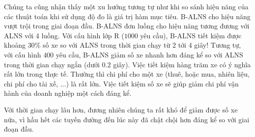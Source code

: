 Chúng ta cũng nhận thấy một xu hướng tương tự như khi so sánh hiệu năng của các thuật toán khi sử dụng độ đo là giá trị hàm mục tiêu. B-ALNS cho hiệu năng vượt trội trong giai đoạn đầu. B-ALNS đơn luồng cho hiệu năng tương đương với ALNS với 4 luồng. Với cấu hình lớp R ($1000$ yêu cầu), B-ALNS tiết kiệm được khoảng $30\%$ số xe so với ALNS trong thời gian chạy từ 2 tới 4 giây! Tương tự, với cấu hình $400$ yêu cầu, B-ALNS giảm số xe nhanh hơn đáng kể so với ALNS trong thời gian chạy ngắn (dưới $0.2$ giây).  Việc tiết kiệm hàng trăm xe có ý nghĩa rất lớn trong thực tế. Thường thì chi phí cho một xe (thuê, hoặc mua, nhiên liệu, chi phí cho tài xế, ...) là rất lớn. Việc tiết kiệm số xe sẽ giúp giảm chi phí vận hành của doanh nghiệp một cách đáng kể. 

Với thời gian chạy lâu hơn, đương nhiên chúng ta rất khó để giảm được số xe nữa, vì hầu hết các tuyến đường đến lúc này đã chật chội hơn đáng kể so với giai đoạn đầu.

